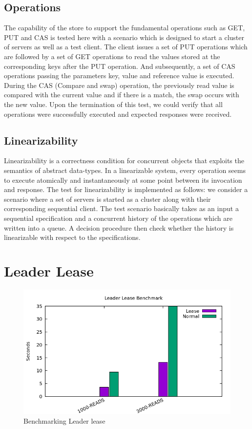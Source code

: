 \documentclass[12pt]{article}
\begin{document}
\subsection{Operations}
The capability of the store to support the fundamental operations such as GET, PUT and CAS is tested here with a scenario which is designed to start a cluster of servers as well as a test client. The client issues a set of PUT operations which are followed by a set of GET operations to read the values stored at the corresponding keys after the PUT operation. And subsequently, a set of CAS operations passing the parameters key, value and reference value is executed. During the CAS (Compare and swap) operation, the previously read value is compared with the current value and if there is a match, the swap occurs with the new value. Upon the termination of this test, we could verify that all operations were successfully executed and expected responses were received.

\subsection{Linearizability}
Linearizability is a correctness condition for concurrent objects that exploits the semantics of abstract data-types. In a linearizable system, every operation seems to execute atomically and instantaneously at some point between its invocation and response. The test for linearizability is implemented as follows: we consider a scenario where a set of servers is started as a cluster along with their corresponding sequential client. The test scenario basically takes as an input a sequential specification and a concurrent history of the operations which are written into a queue. A decision procedure then check whether the history is linearizable with respect to the specifications. 

\section{Leader Lease}

\begin{figure}[H]
  \centering
  \includegraphics[scale=0.6]{img/benchmark.png}
  \caption[Caption for LOF]{Benchmarking Leader lease	}  
  \label{fig:picture}
\end{figure}
\end{document}
